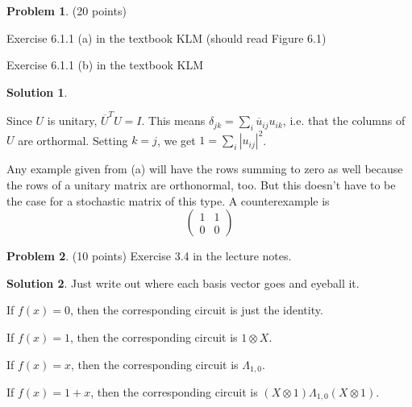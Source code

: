 \documentclass{article}
\theoremstyle{definition}
\newtheorem{problem}{Problem}
\newtheorem*{solution}{Solution}
\begin{document}
\begin{problem}(20 points)
\begin{compactenum}[(a)]
\item Exercise 6.1.1 (a) in the textbook KLM (should read Figure 6.1)
\item Exercise 6.1.1 (b) in the textbook KLM
\end{compactenum}
\end{problem}
\begin{solution}
\begin{compactenum}[(a)]
\item Since $U$ is unitary, $\overline U^T U = I$.  This means $\delta_{jk} = \sum_i \overline u_{ij}  u_{ik}$, i.e. that the
columns of $U$ are orthormal.  Setting $k = j$, we get $1 = \sum_i |u_{ij}|^2$.
\item Any example given from (a) will have the rows summing to zero as well because the rows of a unitary matrix are orthonormal, too.  But this
doesn't have to be the case for a stochastic matrix of this type.  A counterexample is
$$
\begin{pmatrix}
1 & 1 \\
0 & 0
\end{pmatrix}
$$
\end{compactenum}

\end{solution}


\begin{problem} (10 points)
Exercise 3.4 in the lecture notes. 
\end{problem}
\begin{solution}
Just write out where each basis vector goes and eyeball it.
\begin{compactenum}[(a)]
\item If $f(x) = 0$, then the corresponding circuit is just the identity.
\item If $f(x) = 1$, then the corresponding circuit is $1 \otimes X$.
\item If $f(x) = x$, then the corresponding circuit is $\Lambda_{1,0}$.
\item If $f(x) = 1+x$, then the corresponding circuit is $(X \otimes 1) \Lambda_{1,0} (X \otimes 1)$.
\end{compactenum}
\end{solution}
\end{document}
